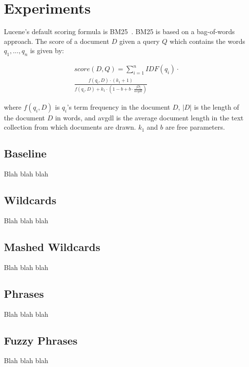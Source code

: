 \documentclass[11pt,a4paper]{article}
\begin{document}
\section{Experiments}

Lucene's default scoring formula is
BM25~\cite{robertson:2009}.  BM25 is based on a
bag-of-words approach. The score of a document $D$ given a query $Q$
which contains the words $q_1, ..., q_n$ is given by: 

\begin{equation}
\begin{split}
  \label{eq:bm25}
score(D,Q) = \sum_{i=1}^{n} IDF(q_i) \cdot \\
  \frac{f(q_i, D) \cdot (k_1 + 1)}{f(q_i, D) + k_1 \cdot (1 - b + b
    \cdot \frac{|D|}{avgdl})}
\end{split}
\end{equation}

where $f(q_i, D)$ is $q_i$'s term frequency in the document $D$, $|D|$
is the length of the document $D$ in words, and avgdl is the average
document length in the text collection from which documents are
drawn. $k_1$ and $b$ are free parameters.


\subsection{Baseline}

Blah blah blah

\subsection{Wildcards}

Blah blah blah

\subsection{Mashed Wildcards}

Blah blah blah

\subsection{Phrases}

Blah blah blah

\subsection{Fuzzy Phrases}

Blah blah blah
\end{document}
